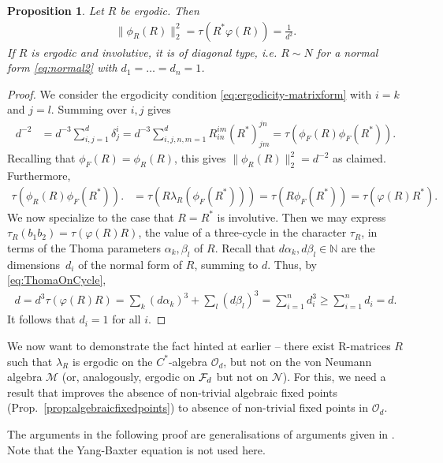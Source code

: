 \documentclass[12pt,a4paper]{amsart}
\numberwithin{equation}{section}
\newtheorem{proposition}[theorem]{Proposition}
\theoremstyle{remark}
\newcommand{\Nl}{\mathbb{N}}
\newcommand{\la}{\lambda}
\newcommand{\CM}[0]{\mathcal{M}} \newcommand{\CN}[0]{\mathcal{N}}
\newcommand{\CO}[0]{\mathcal{O}} \newcommand{\CP}[0]{\mathcal{P}}
\begin{document}
\begin{proposition}\label{proposition:ergodicity-and-characters}
    Let $R$ be ergodic. Then 
    \begin{align}
     \|\phi_R(R)\|_2^2=\tau(R^*\varphi(R))=\frac{1}{d^2}.
    \end{align}
	If $R$ is ergodic and involutive, it is of diagonal type, i.e. $R\sim N$ for a normal form \eqref{eq:normal2} with $d_1=\ldots=d_n=1$.
\end{proposition}
\begin{proof}
    We consider the ergodicity condition \eqref{eq:ergodicity-matrixform} with $i=k$ and $j=l$. Summing over $i,j$ gives
    \begin{align*}
        d^{-2}
        &=
        d^{-3}\sum_{i,j=1}^d\delta_j^i
        =
        d^{-3}\sum_{i,j,n,m=1}^d R^{im}_{in}  (R^*)^{jn}_{jm}
        =
        \tau(\phi_F(R)\phi_F(R^*)).
	\end{align*}
	Recalling that $\phi_F(R)=\phi_R(R)$, this gives $\|\phi_R(R)\|_2^2=d^{-2}$ as claimed. Furthermore,
	\begin{align*}
		\tau(\phi_R(R)\phi_F(R^*)).
        &=
        \tau(R\la_R(\phi_F(R^*)))
        =
        \tau(R\phi_F(R^*))
        =
        \tau(\varphi(R)R^*).
	\end{align*}
	We now specialize to the case that $R=R^*$ is involutive. Then we may express $\tau_R(b_1b_2)=\tau(\varphi(R)R)$, the value of a three-cycle in the character $\tau_R$, in terms of the Thoma parameters $\alpha_k,\beta_l$ of $R$. Recall that $d\alpha_k,d\beta_l\in\Nl$ are the dimensions~$d_i$ of the normal form of $R$, summing to $d$. Thus, by \eqref{eq:ThomaOnCycle},
    \begin{align*}
     d=d^3\tau(\varphi(R)R)=\sum_k(d\alpha_k)^3+\sum_l(d\beta_l)^3
     =
     \sum_{i=1}^n d_i^3
     \geq
     \sum_{i=1}^n d_i
     =d.
    \end{align*}
    It follows that $d_i=1$ for all $i$.
\end{proof}

We now want to demonstrate the fact hinted at earlier -- there exist R-matrices $R$ such that $\la_R$ is ergodic on the $C^*$-algebra $\CO_d$, but not on the von Neumann algebra $\CM$ (or, analogously, ergodic on $\mathcal{F}_d$ but not on $\CN$). For this, we need a result that improves the absence of non-trivial algebraic fixed points (Prop.~\ref{prop:algebraicfixedpoints}) to absence of non-trivial fixed points in $\CO_d$.


The arguments in the following proof are generalisations of arguments given in \cite{MatsumotoTomiyama:1993}. Note that the Yang-Baxter equation is not used here.
\end{document}
